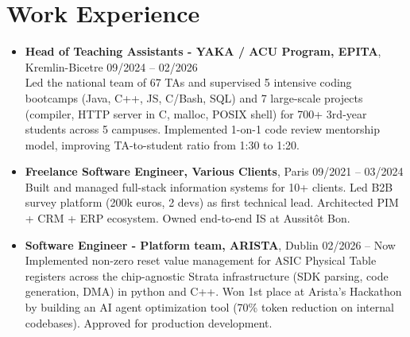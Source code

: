 \documentclass[9pt,a4paper]{article}
\begin{document}
\section*{Work Experience}
\begin{tcolorbox}[mybox]
\begin{itemize}
\item\textbf{Head of Teaching Assistants - YAKA / ACU Program, EPITA}, Kremlin-Bicetre \hfill {\small09/2024 – 02/2026}\\[0.5em]
\textcolor{gray!40!black}{Led the national team of 67 TAs and supervised 5 intensive coding bootcamps (Java, C++, JS, C/Bash, SQL) and 7 large-scale projects (compiler, HTTP server in C, malloc, POSIX shell) for 700+ 3rd-year students across 5 campuses. Implemented 1-on-1 code review mentorship model, improving TA-to-student ratio from 1:30 to 1:20.}

\item\textbf{Freelance Software Engineer, Various Clients}, Paris \hfill {\small09/2021 – 03/2024}\\[0.5em]
\textcolor{gray!40!black}{Built and managed full-stack information systems for 10+ clients. Led B2B survey platform (200k euros, 2 devs) as first technical lead. Architected PIM + CRM + ERP ecosystem. Owned end-to-end IS at Aussitôt Bon.}

\item\textbf{Software Engineer - Platform team, ARISTA}, Dublin \hfill {\small02/2026 – Now}\\[0.5em]
\textcolor{gray!40!black}{Implemented non-zero reset value management for ASIC Physical Table registers across the chip-agnostic Strata infrastructure (SDK parsing, code generation, DMA) in python and C++.
Won 1st place at Arista's Hackathon by building an AI agent optimization tool (70\% token reduction on internal codebases). Approved for production development.}
\end{itemize}
\end{tcolorbox}
\end{document}
